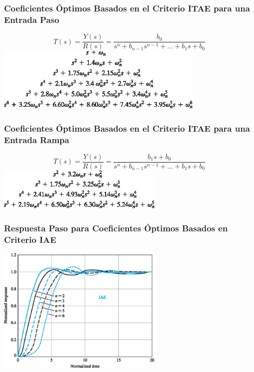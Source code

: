 \documentclass[aspectratio=169,handout]{beamer}
\theoremstyle{definition}
\theoremstyle{plain}
\theoremstyle{remark}
\begin{document}
\begin{frame}[<+->]\frametitle{Coeficientes Óptimos Basados en el Criterio ITAE para una Entrada Paso}
\centering
\begin{equation*}
	T(s) = \frac{Y(s)}{R(s)} = \frac{b_0}{s^n + b_{n-1} s^{n-1} + \dots + b_1 s + b_0}
\end{equation*}
\vspace*{10mm}
\includegraphics[width=10cm]{images/optimCoeffsITAEstep.eps}
\end{frame}

\begin{frame}[<+->]\frametitle{Coeficientes Óptimos Basados en el Criterio ITAE para una Entrada Rampa}
\centering
\begin{equation*}
	T(s) = \frac{Y(s)}{R(s)} = \frac{b_1s + b_0}{s^n + b_{n-1} s^{n-1} + \dots + b_1 s + b_0}
\end{equation*}
\vspace*{10mm}
\includegraphics[width=8cm]{images/optimCoeffsITAEramp.eps} 
\end{frame}

\begin{frame}[c]\frametitle{Respuesta Paso para Coeficientes Óptimos Basados en Criterio IAE}
\vspace*{5mm}
\centering
\includegraphics[width=8cm]{images/stepResponseOptimIAE.eps}
\end{frame}
\end{document}

